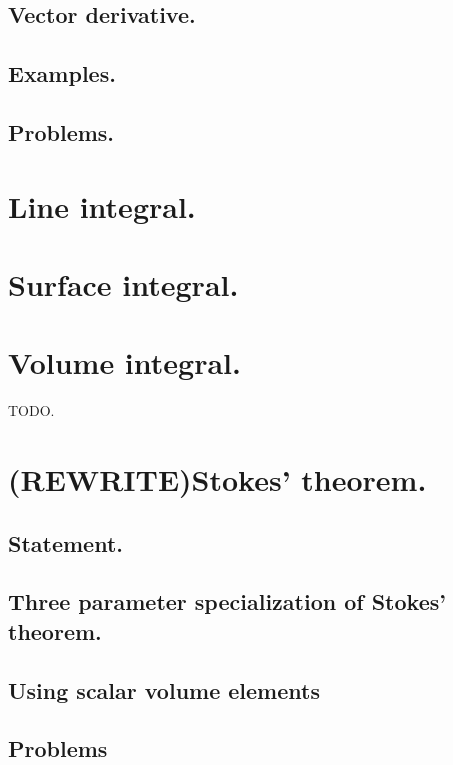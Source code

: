       \subsection{Vector derivative.}
         
      \subsection{Examples.}
         
      \subsection{Problems.}
         
         
         

   \section{Line integral.}
      
   \section{Surface integral.}
      
   \section{Volume integral.}
      TODO.
   \section{(REWRITE)Stokes' theorem.}
      \subsection{Statement.}
         
      \subsection{Three parameter specialization of Stokes' theorem.}
         
      \subsection{Using scalar volume elements}
         
      \subsection{Problems}
         
         
